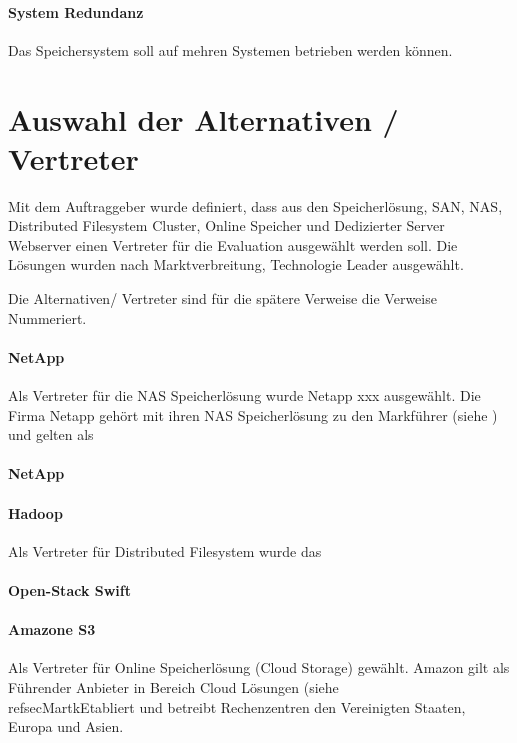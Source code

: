 \paragraph{System Redundanz}
Das Speichersystem soll auf mehren Systemen betrieben werden können.

\section{Auswahl der Alternativen / Vertreter}
Mit dem Auftraggeber wurde definiert, dass aus den Speicherlösung, SAN, NAS, Distributed Filesystem Cluster, Online Speicher und   Dedizierter Server Webserver einen Vertreter für die Evaluation ausgewählt werden soll. Die Lösungen wurden nach Marktverbreitung, Technologie Leader ausgewählt.

Die Alternativen/ Vertreter sind für die spätere Verweise die Verweise Nummeriert.

\setcounter{paragraph}{0}
\renewcommand\theparagraph{Al-\arabic{paragraph}}

\paragraph{NetApp}\label{Al-1}
Als Vertreter für die NAS Speicherlösung wurde Netapp xxx ausgewählt. Die Firma Netapp gehört mit ihren NAS Speicherlösung zu den Markführer (siehe ) und gelten als 

\paragraph{NetApp}\label{Al-2}

\paragraph{Hadoop}\label{Al-3}
Als Vertreter für Distributed Filesystem wurde das 

\paragraph{Open-Stack Swift}



\paragraph{Amazone S3}
Als Vertreter für Online Speicherlösung (Cloud Storage) gewählt. Amazon gilt als Führender Anbieter in Bereich Cloud Lösungen (siehe \\refsec{MartkEtabliert} und betreibt Rechenzentren den Vereinigten Staaten, Europa und Asien. 

